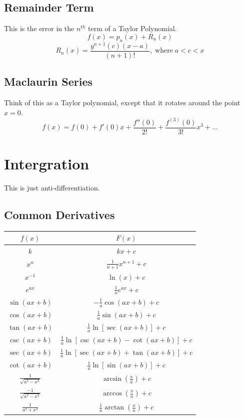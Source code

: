 \documentclass[a5paper]{article}
\begin{document}
	\subsection{Remainder Term}
	This is the error in the $n^{th}$ term of a Taylor Polynomial.
	$$f(x)=p_{n}(x)+R_{n}(x)$$
	$$R_{n}(x)=\frac{y^{n+1}(c)(x-a)}{(n+1)!},\;\text{where}\;a<c<x$$

	\subsection{Maclaurin Series}
	Think of this as a Taylor polynomial, except that it rotates around the point $x=0$.
	$$f(x)=f(0)+f'(0)x+\frac{f''(0)}{2!}+\frac{f^{(3)}(0)}{3!}x^{3}+\ldots$$
	
	\pagebreak

	\section{Intergration}
	This is just anti-differentiation.
	\subsection{Common Derivatives}
	\begin{center}
	\begin{tabular}{ |c|c| }
		\hline
		$f(x)$ & $F(x)$\\
		\hline
		$k$ &  $kx+c$\\
		$x^{n}$ & $\frac{1}{n+1}x^{n+1}+c$\\
		$x^{-1}$ & $\ln{(x)}+c$\\
		$e^{ax}$ & $\frac{1}{a}e^{ax}+c$\\
		$\sin{(ax+b)}$ & $-\frac{1}{a}\cos{(ax+b)}+c$\\
		$\cos{(ax+b)}$ & $\frac{1}{a}\sin{(ax+b)}+c$\\
		$\tan{(ax+b)}$ & $\frac{1}{a}\ln{[\sec{(ax+b)}]}+c$\\
		$\csc{(ax+b)}$ & $\frac{1}{a}\ln{[\csc{(ax+b)}-\cot{(ax+b)}]}+c$\\
		$\sec{(ax+b)}$ & $\frac{1}{a}\ln{[\sec{(ax+b)}+\tan{(ax+b)}]}+c$\\
		$\cot{(ax+b)}$ & $\frac{1}{a}\ln{[\sin{(ax+b)}]}+c$\\
		$\frac{1}{\sqrt{a^{2}-x^{2}}}$ & $\arcsin{(\frac{x}{a})}+c$\\
		$\frac{-1}{\sqrt{a^{2}-x^{2}}}$ & $\arccos{(\frac{x}{a})}+c$\\
		$\frac{1}{a^{2}+x^{2}}$ & $\frac{1}{a}\arctan{(\frac{x}{a})}+c$\\
		\hline
	\end{tabular}
	\end{center}
\end{document}
